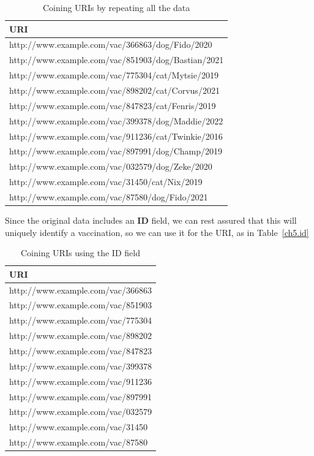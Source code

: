 \begin{table}
    \centering
    \begin{tabular}{|l|}
    \hline
    URI \\
    \hline\hline
http://www.example.com/vac/366863/dog/Fido/2020 \\
http://www.example.com/vac/851903/dog/Bastian/2021 \\
http://www.example.com/vac/775304/cat/Mytsie/2019 \\
http://www.example.com/vac/898202/cat/Corvus/2021 \\
http://www.example.com/vac/847823/cat/Fenris/2019 \\
http://www.example.com/vac/399378/dog/Maddie/2022 \\
http://www.example.com/vac/911236/cat/Twinkie/2016 \\
http://www.example.com/vac/897991/dog/Champ/2019 \\
http://www.example.com/vac/032579/dog/Zeke/2020 \\
http://www.example.com/vac/31450/cat/Nix/2019 \\
http://www.example.com/vac/87580/dog/Fido/2021 \\
\hline
    \end{tabular}
    \caption{Coining URIs by repeating all the data }
    \label{tab:ch5.all}
\end{table}

Since the original data includes an \textbf{ID} field, we can rest assured that this 
will uniquely identify a vaccination, so we can use it for the URI, as in Table~\ref{ch5.id}

\begin{table}
    \centering
    \begin{tabular}{|l |}
    \hline
    URI \\
    \hline\hline
http://www.example.com/vac/366863 \\
http://www.example.com/vac/851903 \\
http://www.example.com/vac/775304 \\
http://www.example.com/vac/898202 \\
http://www.example.com/vac/847823 \\
http://www.example.com/vac/399378 \\
http://www.example.com/vac/911236 \\
http://www.example.com/vac/897991 \\
http://www.example.com/vac/032579 \\
http://www.example.com/vac/31450 \\
http://www.example.com/vac/87580 \\
\hline
    \end{tabular}
    \caption{Coining URIs using the ID field }
    \label{tab:ch5.id}
\end{table}



